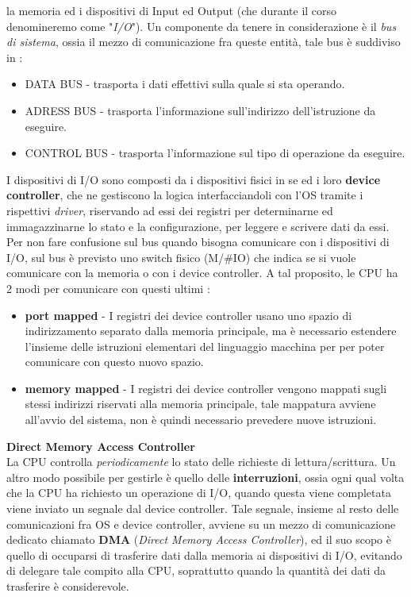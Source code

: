 \documentclass[12pt, letterpaper]{article}
\begin{document}
la memoria ed i dispositivi di Input ed Output (che durante il corso denomineremo come "\textit{I/O}"). Un 
componente da tenere in considerazione è il \textit{bus di sistema}, ossia il mezzo di comunicazione fra 
queste entità, tale bus è suddiviso in :
\begin{itemize}
    \item DATA BUS - trasporta i dati effettivi sulla quale si sta operando.
    \item ADRESS BUS - trasporta l'informazione sull'indirizzo dell'istruzione da eseguire.
    \item CONTROL BUS - trasporta l'informazione sul tipo di operazione da eseguire.
\end{itemize}
I dispositivi di I/O sono composti da i dispositivi fisici in se ed i loro \textbf{device controller}, che ne 
gestiscono la logica interfacciandoli con l'OS tramite i rispettivi \textit{driver}, riservando ad essi dei 
registri per determinarne ed immagazzinarne lo stato e la configurazione, per leggere e scrivere dati da 
essi. Per non fare confusione sul bus quando bisogna comunicare con i dispositivi di I/O, sul bus è previsto
uno switch fisico (M/\#IO) che indica se si vuole comunicare con la memoria o con i device controller. 
A tal proposito, le CPU ha 2 modi per comunicare con questi ultimi : \begin{itemize}
    \item \textbf{port mapped} - I registri dei device controller usano uno spazio di indirizzamento separato
    dalla memoria principale, ma è necessario estendere l'insieme delle istruzioni elementari del linguaggio 
    macchina per per poter comunicare con questo nuovo spazio.
    \item \textbf{memory mapped} - I registri dei device controller vengono mappati sugli stessi indirizzi
    riservati alla memoria principale, tale mappatura avviene all'avvio del sistema, non è quindi necessario
    prevedere nuove istruzioni.
\end{itemize}
\textbf{Direct Memory Access Controller}\\
La CPU controlla \textit{periodicamente} lo stato delle richieste di lettura/scrittura. Un altro modo possibile 
per gestirle è quello delle \textbf{interruzioni}, ossia ogni qual volta che la CPU ha richiesto un operazione
di I/O, quando questa viene completata viene inviato un segnale dal device controller.
Tale segnale, insieme al resto delle comunicazioni fra OS e device controller, avviene su un mezzo di comunicazione
dedicato chiamato \textbf{DMA} (\textit{Direct Memory Access Controller}), ed il suo scopo è quello di occuparsi di trasferire dati dalla memoria ai dispositivi di I/O, 
evitando di delegare tale compito alla CPU, soprattutto quando la quantità dei dati da trasferire è 
considerevole.
\end{document}
